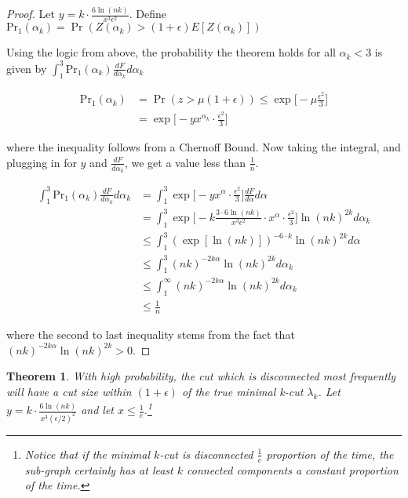\documentclass{acm_proc_article-sp}
\newtheorem{theorem}{Theorem}
\begin{document}
\begin{proof}
Let $y = k \cdot \frac{6 \ln(nk)}{x^3 \epsilon^2}$. Define $\text{Pr}_1(\alpha_k) = \Pr(Z(\alpha_k) > (1+\epsilon) E[Z(\alpha_k)])$

Using the logic from above, the probability the theorem holds for all $\alpha_k < 3$ is given by $\int_{1}^3 \text{Pr}_1(\alpha_k) \frac{dF}{d \alpha_k} d\alpha_k$

\begin{align*}
\text{Pr}_1(\alpha_k) &= \Pr(z > \mu(1 + \epsilon)) \leq \exp \bigg[ -\mu \frac{\epsilon^2}{3}\bigg] \\ 
&= \exp \bigg[-y x^{\alpha_k} \cdot \frac{\epsilon^2}{3} \bigg]
\end{align*}

where the inequality follows from a Chernoff Bound. Now taking the integral, and plugging in for $y$ and $\frac{dF}{d \alpha_k}$, we get a value less than $\frac{1}{n}$.

\begin{align*}
\int_{1}^3 \text{Pr}_1(\alpha_k) \frac{dF}{d \alpha_k} d\alpha_k &= \int_{1}^3 \exp \bigg[-y x^\alpha \cdot \frac{\epsilon^2}{3} \bigg] \frac{dF}{d \alpha} d\alpha \\
&= \int_{1}^{3} \exp \bigg[-k \frac{3 \cdot 6 \ln (nk)}{x^3 \epsilon^2} \cdot x^\alpha \cdot \frac{\epsilon^2}{3}\bigg] \ln(nk)^{2k} d\alpha_k \\
&\leq \int_{1}^3 (\exp[\ln(nk)])^{-6\cdot k} \ln(nk)^{2k} d\alpha \\
&\leq \int_{1}^3 (nk)^{-2 k \alpha} \ln(nk)^{2k} d\alpha_k \\
&\leq \int_{1}^\infty (nk)^{-2k \alpha} \ln(nk)^{2k} d\alpha_k \\
&\leq \frac{1}{n}
\end{align*}

where the second to last inequality stems from the fact that \newline $(nk)^{-2k \alpha} \ln(nk)^{2k}  > 0$.

\end{proof}

\begin{theorem}
With high probability, the cut which is disconnected most frequently will have a cut size within $(1+\epsilon)$ of the true minimal k-cut $\lambda_k$. Let $y = k \cdot \frac{6 \ln(nk)}{x^3 (\epsilon/2)^2}$ and let $x \leq \frac{1}{e}$.\footnote{Notice that if the minimal $k$-cut is disconnected $\frac{1}{e}$ proportion of the time, the sub-graph certainly has at least $k$ connected components a constant proportion of the time.}
\end{theorem}
\end{document}

